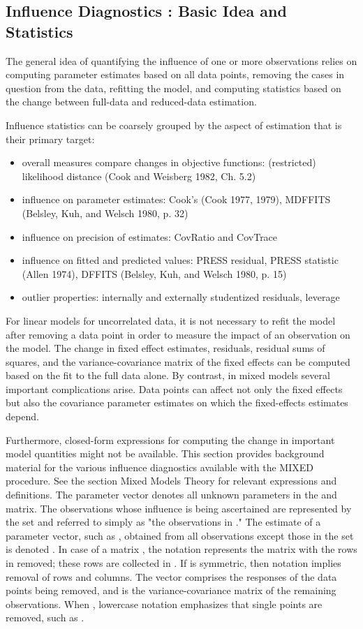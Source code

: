 \documentclass[12pt, a4paper]{article}
\begin{document}
			
			
			\subsection*{Influence Diagnostics : Basic Idea and Statistics}
			
			The general idea of quantifying the influence of one or more observations relies on computing parameter estimates based on all data points, removing the cases in question from the data, refitting the model, and computing statistics based on the change between full-data and reduced-data estimation. 
			
			Influence statistics can be coarsely grouped by the aspect of estimation that is their primary target:
			\begin{itemize}
				\item overall measures compare changes in objective functions: (restricted) likelihood distance (Cook and Weisberg 1982, Ch. 5.2)
				\item influence on parameter estimates: Cook’s  (Cook 1977, 1979), MDFFITS (Belsley, Kuh, and Welsch 1980, p. 32)
				\item influence on precision of estimates: CovRatio and CovTrace
				\item influence on fitted and predicted values: PRESS residual, PRESS statistic (Allen 1974), DFFITS (Belsley, Kuh, and Welsch 1980, p. 15)
				\item outlier properties: internally and externally studentized residuals, leverage
			\end{itemize}
			For linear models for uncorrelated data, it is not necessary to refit the model after removing a data point in order to measure the impact of an observation on the model. The change in fixed effect estimates, residuals, residual sums of squares, and the variance-covariance matrix of the fixed effects can be computed based on the fit to the full data alone. By contrast, in mixed models several important complications arise. Data points can affect not only the fixed effects but also the covariance parameter estimates on which the fixed-effects estimates depend. 
			
			Furthermore, closed-form expressions for computing the change in important model quantities might not be available.
			This section provides background material for the various influence diagnostics available with the MIXED procedure. See the section Mixed Models Theory for relevant expressions and definitions. The parameter vector  denotes all unknown parameters in the  and  matrix.
			The observations whose influence is being ascertained are represented by the set  and referred to simply as "the observations in ." The estimate of a parameter vector, such as , obtained from all observations except those in the set  is denoted . In case of a matrix , the notation  represents the matrix with the rows in  removed; these rows are collected in . If  is symmetric, then notation  implies removal of rows and columns. The vector  comprises the responses of the data points being removed, and  is the variance-covariance matrix of the remaining observations. When , lowercase notation emphasizes that single points are removed, such as .
			
\end{document}

